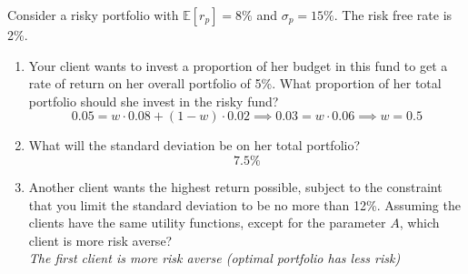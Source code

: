 \documentclass[11pt]{article}
\theoremstyle{definition}
\begin{document}
\begin{shaded}
\begin{enumerate}
    \end{enumerate}
    \end{shaded}

    \begin{shaded}
    Consider a risky portfolio with $\mathbb{E}[r_p]=8\%$ and $\sigma_p=15\%$.   The risk free rate is 2\%.
    \begin{enumerate}
        \item Your client wants to invest a proportion of her budget in this fund to get a rate of return on her overall portfolio of 5\%.   What proportion of her total portfolio should she invest in the risky fund?
        $$0.05 = w\cdot0.08 + (1-w)\cdot0.02 \implies 0.03 = w \cdot 0.06 \implies w = 0.5$$
        \item What will the standard deviation be on her total portfolio?
        $$7.5\%$$
        \item Another client wants the highest return possible, subject to the constraint that you 
        limit the standard deviation to be no more than 12\%.   Assuming the clients have the same utility functions, except for the parameter $A$, which client is more risk averse?\\
        \textit{The first client is more risk averse (optimal portfolio has less risk)}
    \end{enumerate}
    \end{shaded}
\end{document}
